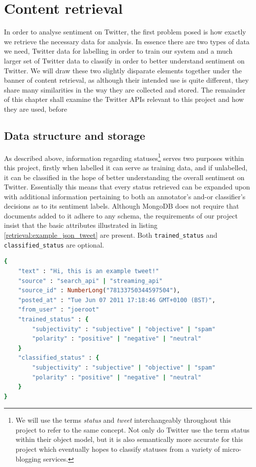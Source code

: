 \chapter{Content retrieval}
\label{retrieval}

In order to analyse sentiment on Twitter, the first problem posed is how exactly we retrieve the necessary data for analysis. In essence there are two types of data we need, Twitter data for labelling in order to train our system and a much larger set of Twitter data to classify in order to better understand sentiment on Twitter. We will draw these two slightly disparate elements together under the banner of content retrieval, as although their intended use is quite different, they share many similarities in the way they are collected and stored. The remainder of this chapter shall examine the Twitter APIs relevant to this project and how they are used, before 

\section{Data structure and storage}
\label{retrieval:data}

As described above, information regarding statuses\footnote{We will use the terms \emph{status} and \emph{tweet} interchangeably throughout this project to refer to the same concept. Not only do Twitter use the term status within their object model, but it is also semantically more accurate for this project which eventually hopes to classify statuses from a variety of micro-blogging services.} serves two purposes within this project, firstly when labelled it can serve as training data, and if unlabelled, it can be classified in the hope of better understanding the overall sentiment on Twitter. Essentially this means that every status retrieved can be expanded upon with additional information pertaining to both an annotator's and-or classifier's decisions as to its sentiment labels. Although MongoDB does not require that documents added to it adhere to any schema, the requirements of our project insist that the basic attributes illustrated in listing \ref{retrieval:example_json_tweet} are present. Both \texttt{trained\-\_status} and \texttt{classified\-\_status} are optional.

\begin{lstlisting}[language=Ruby, caption={Basic JSON structure for status objects stored in MongoDB}, label=retrieval:example_json_tweet]
{
	"text" : "Hi, this is an example tweet!"
	"source" : "search_api" | "streaming_api"
	"source_id" : NumberLong("78133750344597504"),
	"posted_at" : "Tue Jun 07 2011 17:18:46 GMT+0100 (BST)",
	"from_user" : "joeroot"
	"trained_status" : {
		"subjectivity" : "subjective" | "objective" | "spam"
		"polarity" : "positive" | "negative" | "neutral"
	}
	"classified_status" : {
		"subjectivity" : "subjective" | "objective" | "spam"
		"polarity" : "positive" | "negative" | "neutral"
	}
}
\end{lstlisting}

